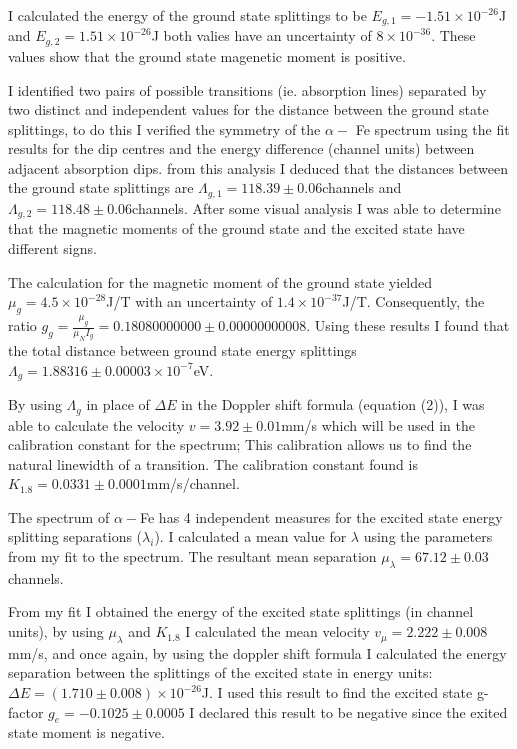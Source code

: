 \documentclass[a4paper, twocolumn]{article}
\begin{document}
I calculated the energy of the ground state splittings to be $E_{g,1} = -1.51\times10^{-26}$J and $E_{g,2} = 1.51\times10^{-26}$J both valies have an uncertainty of $8\times10^{-36}$. These values show that the ground state magenetic moment is positive.

I identified two pairs of possible transitions (ie. absorption lines) separated by two distinct and independent values for the distance between the ground state splittings, to do this I verified the symmetry of the $\alpha-$ Fe spectrum using the fit results for the dip centres and the energy difference (channel units) between adjacent absorption dips. from this analysis I deduced that the distances between the ground state splittings are $\Lambda_{g,1} = 118.39\pm 0.06$channels and $\Lambda_{g,2} = 118.48\pm 0.06$channels. After some visual analysis I was able to determine that the magnetic moments of the ground state and the excited state have different signs.

The calculation for the magnetic moment of the ground state yielded $\mu_g = 4.5\times10^{-28}$J/T with an uncertainty of $1.4\times10^{-37}$J/T. Consequently, the ratio $g_g = \frac{\mu_g}{\mu_N I_g} = 0.18080000000\pm 0.00000000008$. Using these results I found that the total distance between ground state energy splittings $\Lambda_g = 1.88316\pm 0.00003\times10^{-7}$eV.

By using $\Lambda_g$ in place of $\Delta E$ in the Doppler shift formula (equation (2)), I was able to calculate the velocity $v = 3.92\pm0.01$mm/s which will be used in the calibration constant for the spectrum; This calibration allows us to find the natural linewidth of a transition.
The calibration constant found is $K_{1.8} = 0.0331\pm0.0001$mm/s/channel.

The spectrum of $\alpha-$Fe has 4 independent measures for the excited state energy splitting separations ($\lambda_i$). I calculated a mean value for $\lambda$ using the parameters from my fit to the spectrum. The resultant mean separation $\mu_{\lambda} = 67.12\pm0.03$channels.

From my fit I obtained the energy of the excited state splittings (in channel units), by using $\mu_{\lambda}$ and $K_{1.8}$ I calculated the mean velocity $v_{\mu} = 2.222\pm0.008$mm/s, and once again, by using the doppler shift formula I calculated the energy separation between the splittings of the excited state in energy units: $\Delta E = (1.710\pm0.008)\times10^{-26}$J. I used this result to find the excited state g-factor $g_e = -0.1025\pm0.0005$ I declared this result to be negative since the exited state moment is negative.
\end{document}

